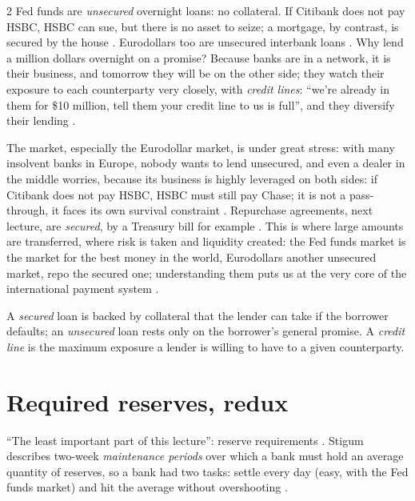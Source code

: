 \begin{paracol}{2}
Fed funds are \emph{unsecured} overnight loans: no collateral. If Citibank does not pay HSBC, HSBC can sue, but there is no asset to seize; a mortgage, by contrast,
is secured by the house . Eurodollars too are unsecured interbank loans . Why lend a million dollars
overnight on a promise? Because banks are in a network, it is their business, and tomorrow they will be on the other side; they watch their exposure to each
counterparty very closely, with \emph{credit lines}: ``we're already in them for \$10 million, tell them your credit line to us is full'', and they diversify
their lending .

The market, especially the Eurodollar market, is under great stress: with many insolvent banks in Europe, nobody wants to lend unsecured, and even a dealer in the
middle worries, because its business is highly leveraged on both sides: if Citibank does not pay HSBC, HSBC must still pay Chase; it is not a pass-through, it faces its
own survival constraint . Repurchase agreements, next lecture, are \emph{secured}, by a Treasury bill for example
. This is where large amounts are transferred, where risk is taken and liquidity created: the Fed funds market is the market for the best money in
the world, Eurodollars another unsecured market, repo the secured one; understanding them puts us at the very core of the international payment system
.

\begin{definition}
A \emph{secured} loan is backed by collateral that the lender can take if the borrower defaults; an \emph{unsecured} loan rests only on the borrower's general
promise. A \emph{credit line} is the maximum exposure a lender is willing to have to a given counterparty.
\end{definition}

\section{Required reserves, redux}\label{sec:ff-required}

``The least important part of this lecture'': reserve requirements . Stigum describes two-week \emph{maintenance periods} over which a bank must hold
an average quantity of reserves, so a bank had two tasks: settle every day (easy, with the Fed funds market) and hit the average without overshooting
.


\end{paracol}
